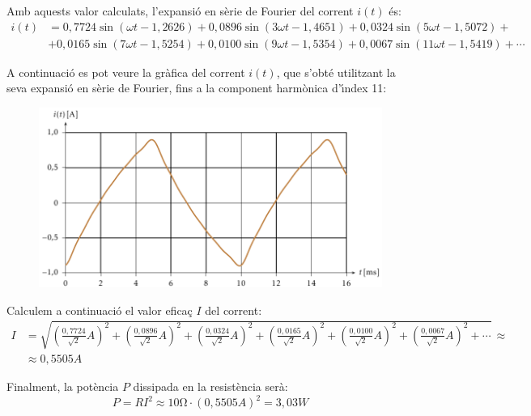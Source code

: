 \begin{exemple}
Amb aquests valor calculats, l'expansi\'{o} en s\`{e}rie de Fourier del
corrent $i(t)$ \'{e}s:
\[\begin{split}
     i(t) &=  0{,}7724 \sin(\omega t - 1{,}2626) +  0{,}0896 \sin(3 \omega t -
     1{,}4651) + 0{,}0324 \sin(5 \omega t - 1{,}5072) +{}\\
     &+ 0{,}0165 \sin(7 \omega t - 1{,}5254) + 0{,}0100 \sin(9 \omega t - 1{,}5354)
     +0{,}0067 \sin(11 \omega t - 1{,}5419) +\cdots
\end{split}\]

A continuaci\'{o} es pot veure la gr\`{a}fica del corrent $i(t)$, que s'obt\'{e}
utilitzant la seva expansi\'{o} en s\`{e}rie de Fourier, fins a la component
harm\`{o}nica d'\'{\i}ndex 11:

\begin{figure}[h]
\centering
  \includegraphics{Imatges/Cap-Fourier-Exemple-Corrent.pdf}
\end{figure}

Calculem a continuaci\'{o} el valor efica\c{c} $I$ del corrent:
\[\begin{split}
    I &= \sqrt{\left(\tfrac{0{,}7724}{\sqrt{2}}\unit{A}\right)^2 +
        \left(\tfrac{0{,}0896}{\sqrt{2}}\unit{A}\right)^2 +
        \left(\tfrac{0{,}0324}{\sqrt{2}}\unit{A}\right)^2 +
        \left(\tfrac{0{,}0165}{\sqrt{2}}\unit{A}\right)^2 +
        \left(\tfrac{0{,}0100}{\sqrt{2}}\unit{A}\right)^2 +
        \left(\tfrac{0{,}0067}{\sqrt{2}}\unit{A}\right)^2 + \cdots}
        \,\approx \\[1ex]
        &\approx 0{,}5505\unit{A}
\end{split}\]

Finalment, la pot\`{e}ncia $P$ dissipada en la resist\`{e}ncia ser\`{a}:
\[
    P = R I^2 \approx 10\unit{\ohm} \cdot (0{,}5505\unit{A})^2 =
    3{,}03\unit{W}
\]


\end{exemple}
